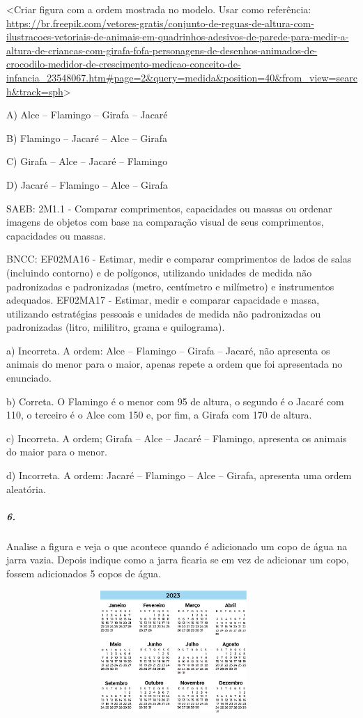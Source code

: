 \textless{}Criar figura com a ordem mostrada no modelo. Usar como
referência:
\url{https://br.freepik.com/vetores-gratis/conjunto-de-reguas-de-altura-com-ilustracoes-vetoriais-de-animais-em-quadrinhos-adesivos-de-parede-para-medir-a-altura-de-criancas-com-girafa-fofa-personagens-de-desenhos-animados-de-crocodilo-medidor-de-crescimento-medicao-conceito-de-infancia_23548067.htm\#page=2\&query=medida\&position=40\&from_view=search\&track=sph}\textgreater{}

A) Alce -- Flamingo -- Girafa -- Jacaré

B) Flamingo -- Jacaré -- Alce -- Girafa

C) Girafa -- Alce -- Jacaré -- Flamingo

D) Jacaré -- Flamingo -- Alce -- Girafa

SAEB: 2M1.1 - Comparar comprimentos, capacidades ou massas ou ordenar
imagens de objetos com base na comparação visual de seus comprimentos,
capacidades ou massas.

BNCC: EF02MA16 - Estimar, medir e comparar comprimentos de lados de
salas (incluindo contorno) e de polígonos, utilizando unidades de medida
não padronizadas e padronizadas (metro, centímetro e milímetro) e
instrumentos adequados. EF02MA17 - Estimar, medir e comparar capacidade
e massa, utilizando estratégias pessoais e unidades de medida não
padronizadas ou padronizadas (litro, mililitro, grama e quilograma).

a) Incorreta. A ordem: Alce -- Flamingo -- Girafa -- Jacaré, não
apresenta os animais do menor para o maior, apenas repete a ordem que
foi apresentada no enunciado.

b) Correta. O Flamingo é o menor com 95 de altura, o segundo é o Jacaré
com 110, o terceiro é o Alce com 150 e, por fim, a Girafa com 170 de
altura.

c) Incorreta. A ordem; Girafa -- Alce -- Jacaré -- Flamingo, apresenta
os animais do maior para o menor.

d) Incorreta. A ordem: Jacaré -- Flamingo -- Alce -- Girafa, apresenta
uma ordem aleatória.

\subparagraph{6. }\label{section-135}

Analise a figura e veja o que acontece quando é adicionado um copo de
água na jarra vazia. Depois indique como a jarra ficaria se em vez de
adicionar um copo, fossem adicionados 5 copos de água.

\includegraphics[width=5.00000in,height=1.82640in]{media/image144.png}

